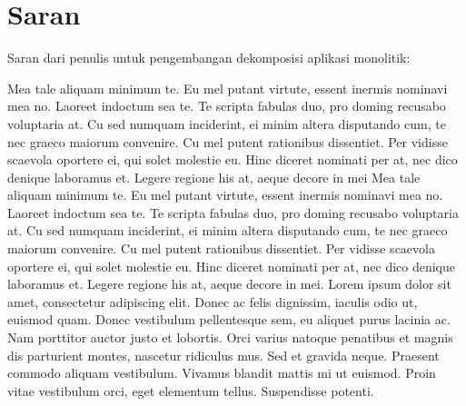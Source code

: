\section{Saran}
Saran dari penulis untuk pengembangan dekomposisi aplikasi monolitik:

Mea tale aliquam minimum te. Eu mel putant virtute, essent inermis nominavi mea no. Laoreet indoctum sea te. Te scripta fabulas duo, pro doming recusabo voluptaria at. Cu sed numquam inciderint, ei minim altera disputando cum, te nec graeco maiorum convenire.
Cu mel putent rationibus dissentiet. Per vidisse scaevola oportere ei, qui solet molestie eu. Hinc diceret nominati per at, nec dico denique laboramus et. Legere regione his at, aeque decore in mei
Mea tale aliquam minimum te. Eu mel putant virtute, essent inermis nominavi mea no. Laoreet indoctum sea te. Te scripta fabulas duo, pro doming recusabo voluptaria at. Cu sed numquam inciderint, ei minim altera disputando cum, te nec graeco maiorum convenire.
Cu mel putent rationibus dissentiet. Per vidisse scaevola oportere ei, qui solet molestie eu. Hinc diceret nominati per at, nec dico denique laboramus et. Legere regione his at, aeque decore in mei.
Lorem ipsum dolor sit amet, consectetur adipiscing elit. Donec ac felis dignissim, iaculis odio ut, euismod quam. Donec vestibulum pellentesque sem, eu aliquet purus lacinia ac. Nam porttitor auctor justo et lobortis. Orci varius natoque penatibus et magnis dis parturient montes, nascetur ridiculus mus. Sed et gravida neque. Praesent commodo aliquam vestibulum. Vivamus blandit mattis mi ut euismod. Proin vitae vestibulum orci, eget elementum tellus. Suspendisse potenti.\\